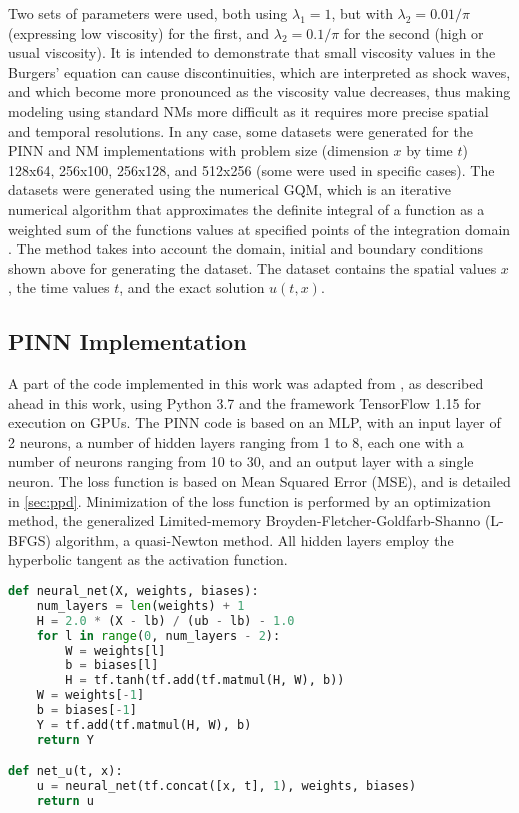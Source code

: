 Two sets of parameters were used, both using $\lambda_1 = 1$, but with $\lambda_2 = {0.01}/{\pi}$ (expressing low viscosity) for the first, and $\lambda_2 = {0.1}/{\pi}$ for the second (high or usual viscosity). It is intended to demonstrate that small viscosity values in the Burgers' equation can cause discontinuities, which are interpreted as shock waves, and which become more pronounced as the viscosity value decreases, thus making modeling using standard NMs more difficult as it requires more precise spatial and temporal resolutions. In any case, some datasets were generated for the PINN and NM implementations with problem size (dimension $x$ by time $t$) 128x64, 256x100, 256x128, and 512x256 (some were used in specific cases). The datasets were generated using the numerical GQM, which is an iterative numerical algorithm that approximates the definite integral of a function as a weighted sum of the functions values at specified points of the integration domain \cite{Burkardt2013}. The method takes into account the domain, initial and boundary conditions shown above for generating the dataset. The dataset contains the spatial values $x$, the time values $t$, and the exact solution $u(t,x)$.


\subsection{PINN Implementation}

A part of the code implemented in this work was adapted from , as described ahead in this work, using Python 3.7 and the framework TensorFlow 1.15 for execution on GPUs. The PINN code is based on an MLP, with an input layer of 2 neurons, a number of hidden layers ranging from 1 to 8, each one with  a number of neurons ranging from 10 to 30, and an output layer with a single neuron. The loss function is based on Mean Squared Error (MSE), and is detailed in \autoref{sec:ppd}. Minimization of the loss function is performed by an optimization method, the generalized Limited-memory Broyden-Fletcher-Goldfarb-Shanno (L-BFGS) algorithm, a quasi-Newton method. All hidden layers employ the hyperbolic tangent as the activation function. 

\begin{minipage}[htb]{\columnwidth}
\begin{lstlisting}[language=Python, label=lst:utx, 
caption={Snippet of Python code that implements $u(t,x)$, seen in the listing as \texttt{net\_u(t, x)}.}]
def neural_net(X, weights, biases):
	num_layers = len(weights) + 1
	H = 2.0 * (X - lb) / (ub - lb) - 1.0
	for l in range(0, num_layers - 2):
		W = weights[l]
		b = biases[l]
		H = tf.tanh(tf.add(tf.matmul(H, W), b))
	W = weights[-1]
	b = biases[-1]
	Y = tf.add(tf.matmul(H, W), b)
	return Y

def net_u(t, x):
	u = neural_net(tf.concat([x, t], 1), weights, biases)
	return u
\end{lstlisting}
\end{minipage}%

